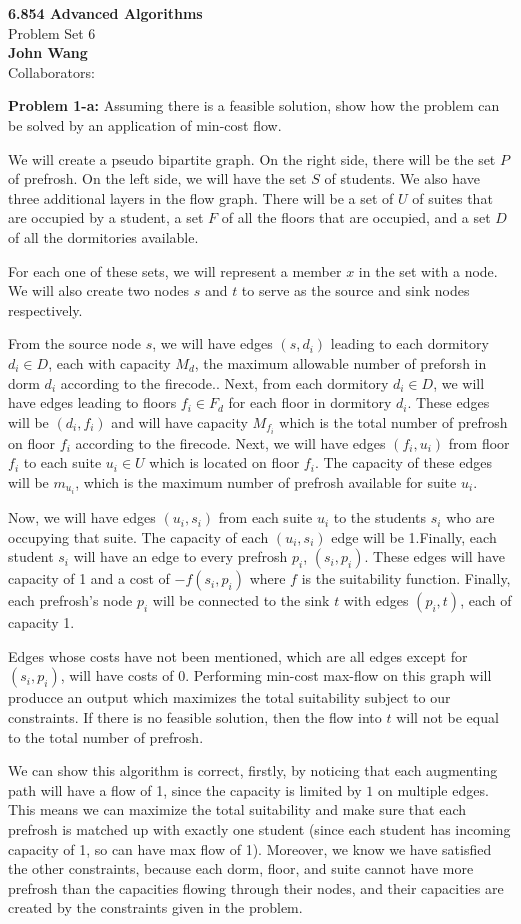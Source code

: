 \documentclass[psamsfonts]{amsart}
\newenvironment{sol}{\vspace{0.25cm}{\large \bfseries Solution:}}{\qedsymbol}
\newenvironment{prob}[1]{\begin{framed}{\large \bfseries Problem #1:}}{\end{framed}}
\newcommand{\makenewtitle}{
    \begin{center}
    {\huge \bfseries 6.854 Advanced Algorithms} \\
    Problem Set 6\\
    \vspace{0.25cm}
    {\bfseries John Wang} \\
    Collaborators: 
    \end{center}
    \vspace{0.5cm}
}
\begin{document}
\makenewtitle

\begin{prob}{1-a}
Assuming there is a feasible solution, show how the problem can be solved by an application of min-cost flow.
\end{prob}

\begin{sol}
We will create a pseudo bipartite graph. On the right side, there will be the set $P$ of prefrosh. On the left side, we will have the set $S$ of students. We also have three additional layers in the flow graph. There will be a set of $U$ of suites that are occupied by a student, a set $F$ of all the floors that are occupied, and a set $D$ of all the dormitories available. 

For each one of these sets, we will represent a member $x$ in the set with a node. We will also create two nodes $s$ and $t$ to serve as the source and sink nodes respectively. 

From the source node $s$, we will have edges $(s, d_i)$ leading to each dormitory $d_i \in D$, each with capacity $M_d$, the maximum allowable number of preforsh in dorm $d_i$ according to the firecode.. Next, from each dormitory $d_i \in D$, we will have edges leading to floors $f_i \in F_d$ for each floor in dormitory $d_i$. These edges will be $(d_i, f_i)$ and will have capacity $M_{f_i}$ which is the total number of prefrosh on floor $f_i$ according to the firecode. Next, we will have edges $(f_i, u_i)$ from floor $f_i$ to each suite $u_i \in U$ which is located on floor $f_i$. The capacity of these edges will be $m_{u_i}$, which is the maximum number of prefrosh available for suite $u_i$. 

Now, we will have edges $(u_i, s_i)$ from each suite $u_i$ to the students $s_i$ who are occupying that suite. The capacity of each $(u_i, s_i)$ edge will be 1.Finally, each student $s_i$ will have an edge to every prefrosh $p_i$, $(s_i, p_i)$. These edges will have capacity of 1 and a cost of $-f(s_i, p_i)$ where $f$ is the suitability function. Finally, each prefrosh's node $p_i$ will be connected to the sink $t$ with edges $(p_i, t)$, each of capacity 1.

Edges whose costs have not been mentioned, which are all edges except for $(s_i, p_i)$, will have costs of 0. Performing min-cost max-flow on this graph will producce an output which maximizes the total suitability subject to our constraints. If there is no feasible solution, then the flow into $t$ will not be equal to the total number of prefrosh.

We can show this algorithm is correct, firstly, by noticing that each augmenting path will have a flow of 1, since the capacity is limited by $1$ on multiple edges. This means we can maximize the total suitability and make sure that each prefrosh is matched up with exactly one student (since each student has incoming capacity of 1, so can have max flow of 1). Moreover, we know we have satisfied the other constraints, because each dorm, floor, and suite cannot have more prefrosh than the capacities flowing through their nodes, and their capacities are created by the constraints given in the problem.
\end{sol}
\end{document}
